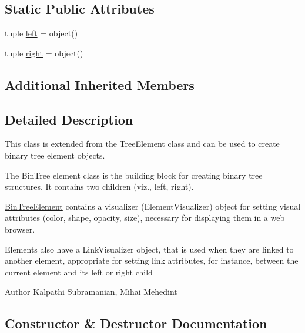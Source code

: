 \subsection*{Static Public Attributes}
\begin{DoxyCompactItemize}
\item 
tuple \hyperlink{classbridges_1_1bin__tree__element_1_1_bin_tree_element_aa3363fa417561642fe5c025465a284bc}{left} = object()
\item 
tuple \hyperlink{classbridges_1_1bin__tree__element_1_1_bin_tree_element_a1178847a9c2ea50957f0724e2552fa36}{right} = object()
\end{DoxyCompactItemize}
\subsection*{Additional Inherited Members}


\subsection{Detailed Description}
This class is extended from the Tree\+Element class and can be used to create binary tree element objects. 

The Bin\+Tree element class is the building block for creating binary tree structures. It contains two children (viz., left, right).

\hyperlink{classbridges_1_1bin__tree__element_1_1_bin_tree_element}{Bin\+Tree\+Element} contains a visualizer (Element\+Visualizer) object for setting visual attributes (color, shape, opacity, size), necessary for displaying them in a web browser.

Elements also have a Link\+Visualizer object, that is used when they are linked to another element, appropriate for setting link attributes, for instance, between the current element and its left or right child

\begin{DoxyAuthor}{Author}
Kalpathi Subramanian, Mihai Mehedint 
\end{DoxyAuthor}


\subsection{Constructor \& Destructor Documentation}
\hypertarget{classbridges_1_1bin__tree__element_1_1_bin_tree_element_a8b246c45efa79208aab73069faecd976}{}
